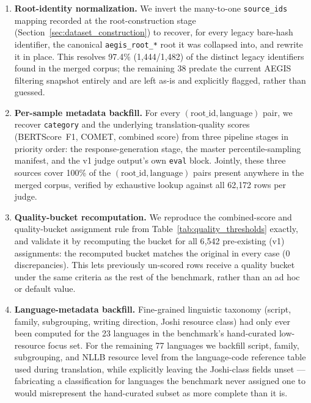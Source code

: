 \begin{enumerate}
  \item \textbf{Root-identity normalization.} We invert the many-to-one
  \texttt{source\_ids} mapping recorded at the root-construction stage
  (Section~\ref{sec:dataset_construction}) to recover, for every legacy
  bare-hash identifier, the canonical \texttt{aegis\_root\_*} root it was
  collapsed into, and rewrite it in place. This resolves 97.4\%
  (1{,}444/1{,}482) of the distinct legacy identifiers found in the merged
  corpus; the remaining 38 predate the current AEGIS filtering snapshot
  entirely and are left as-is and explicitly flagged, rather than guessed.

  \item \textbf{Per-sample metadata backfill.} For every $(\text{root\_id},
  \text{language})$ pair, we recover \texttt{category} and the underlying
  translation-quality scores (BERTScore~F1, COMET, combined score) from three
  pipeline stages in priority order: the response-generation stage, the
  master percentile-sampling manifest, and the v1 judge output's own
  \texttt{eval} block. Jointly, these three sources cover 100\% of the
  $(\text{root\_id}, \text{language})$ pairs present anywhere in the merged
  corpus, verified by exhaustive lookup against all 62{,}172 rows per judge.

  \item \textbf{Quality-bucket recomputation.} We reproduce the combined-score
  and quality-bucket assignment rule from Table~\ref{tab:quality_thresholds}
  exactly, and validate it by recomputing the bucket for all 6{,}542
  pre-existing (v1) assignments: the recomputed bucket matches the original
  in every case (0 discrepancies). This lets previously un-scored rows
  receive a quality bucket under the same criteria as the rest of the
  benchmark, rather than an ad hoc or default value.

  \item \textbf{Language-metadata backfill.} Fine-grained linguistic taxonomy
  (script, family, subgrouping, writing direction, Joshi resource class) had
  only ever been computed for the 23 languages in the benchmark's hand-curated
  low-resource focus set. For the remaining 77 languages we backfill script,
  family, subgrouping, and NLLB resource level from the language-code
  reference table used during translation, while explicitly leaving the
  Joshi-class fields unset --- fabricating a classification for languages the
  benchmark never assigned one to would misrepresent the hand-curated subset
  as more complete than it is.
\end{enumerate}

